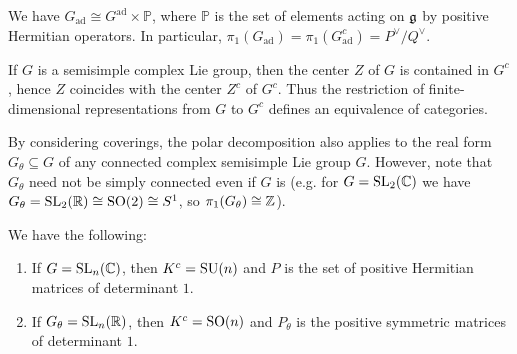 \begin{corollary}
  We have $G_{\mathrm{ad}} \cong G^{\mathrm{ad}} \times \mathbb{P}$,
  where $\mathbb{P}$ is the set of elements
  acting on $\mathfrak{g}$ by positive Hermitian
  operators. In particular,
  $\pi_1(G_{\mathrm{ad}}) = \pi_1(G_{\mathrm{ad}}^c) = P^\vee / Q^\vee$.
\end{corollary}

\begin{corollary}
  If $G$ is a semisimple complex Lie group,
  then the center $Z$ of $G$ is contained
  in $G^c$,
  hence $Z$ coincides with the center
  $Z^c$ of $G^c$. Thus the restriction
  of finite-dimensional representations
  from $G$ to $G^c$ defines an
  equivalence of categories.
\end{corollary}

\begin{remark}
  By considering coverings, the polar
  decomposition also applies to the
  real form $G_\theta \subseteq G$ of any
  connected complex semisimple Lie
  group $G$. However, note that
  $G_\theta$ need not be simply
  connected even if $G$ is (e.g.
  for $G = \operatorname{SL}_2(\mathbb{C})$ we have
  $G_\theta = \operatorname{SL}_2(\mathbb{R}) \cong \operatorname{SO}(2) \cong S^1$,
  so $\pi_1(G_\theta) \cong \mathbb{Z}$).
\end{remark}

\begin{example}
  We have the following:
  \begin{enumerate}
    \item If $G = \operatorname{SL}_n(\mathbb{C})$, then
      $K^c = \operatorname{SU}(n)$ and $P$
      is the set of positive Hermitian
      matrices of determinant $1$.
    \item If $G_\theta = \operatorname{SL}_n(\mathbb{R})$,
      then $K^c = \operatorname{SO}(n)$ and
      $P_\theta$ is the positive
      symmetric matrices of determinant
      $1$.
  \end{enumerate}
\end{example}
